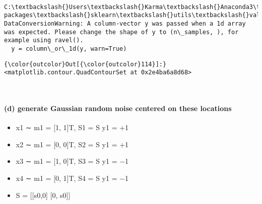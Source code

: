 \documentclass[11pt]{article}
\providecommand{\tightlist}{%
      \setlength{\itemsep}{0pt}\setlength{\parskip}{0pt}}
\begin{document}
    \begin{center}
    \end{center}
    { \hspace*{\fill} \\}
    
    \begin{Verbatim}[commandchars=\\\{\}]
C:\textbackslash{}Users\textbackslash{}Karma\textbackslash{}Anaconda3\textbackslash{}envs\textbackslash{}tflo\textbackslash{}lib\textbackslash{}site-packages\textbackslash{}sklearn\textbackslash{}utils\textbackslash{}validation.py:578: DataConversionWarning: A column-vector y was passed when a 1d array was expected. Please change the shape of y to (n\_samples, ), for example using ravel().
  y = column\_or\_1d(y, warn=True)

    \end{Verbatim}

\begin{Verbatim}[commandchars=\\\{\}]
{\color{outcolor}Out[{\color{outcolor}114}]:} <matplotlib.contour.QuadContourSet at 0x2e4ba6a8d68>
\end{Verbatim}
            
    \begin{center}
    \end{center}
    { \hspace*{\fill} \\}
    
    \paragraph{(d) generate Gaussian random noise centered on these
locations}\label{d-generate-gaussian-random-noise-centered-on-these-locations}

\begin{itemize}
\tightlist
\item
  x1 ∼ m1 = {[}1, 1{]}T, S1 = S y1 = +1
\item
  x2 ∼ m1 = {[}0, 0{]}T, S2 = S y1 = +1
\item
  x3 ∼ m1 = {[}1, 0{]}T, S3 = S y1 = −1
\item
  x4 ∼ m1 = {[}0, 1{]}T, S4 = S y1 = −1
\item
  S = {[}{[}s0,0{]} {[}0, s0{]}{]}
\end{itemize}
\end{document}

